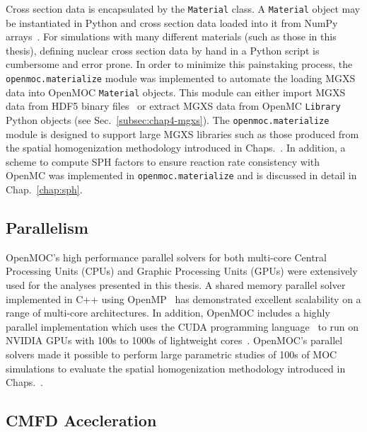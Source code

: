Cross section data is encapsulated by the \texttt{Material} class. A \texttt{Material} object may be instantiated in Python and cross section data loaded into it from NumPy arrays~\cite{walt2011numpy}. For simulations with many different materials (such as those in this thesis), defining nuclear cross section data by hand in a Python script is cumbersome and error prone. In order to minimize this painstaking process, the \texttt{openmoc.materialize} module was implemented to automate the loading \ac{MGXS} data into OpenMOC \texttt{Material} objects. This module can either import \ac{MGXS} data from HDF5 binary files~\cite{koranne2011hdf5} or extract \ac{MGXS} data from OpenMC \texttt{Library} Python objects (see Sec.~\ref{subsec:chap4-mgxs}). The \texttt{openmoc.materialize} module is designed to support large \ac{MGXS} libraries such as those produced from the spatial homogenization methodology introduced in Chaps.~. In addition, a scheme to compute \ac{SPH} factors to ensure reaction rate consistency with OpenMC was implemented in \texttt{openmoc.materialize} and is discussed in detail in Chap.~\ref{chap:sph}.

\subsection{Parallelism}
\label{subsubsec:chap4-openmoc-parallel}

OpenMOC's high performance parallel solvers for both multi-core Central Processing Units (CPUs) and Graphic Processing Units (GPUs) were extensively used for the analyses presented in this thesis. A shared memory parallel solver implemented in C++ using OpenMP~\cite{openmp2013} has demonstrated excellent scalability on a range of multi-core architectures\cite{boyd2016parallel}. In addition, OpenMOC includes a highly parallel implementation which uses the CUDA programming language~\cite{nvidia2012cuda} to run on NVIDIA GPUs with 100s to 1000s of lightweight cores~\cite{boyd2013massively}. OpenMOC's parallel solvers made it possible to perform large parametric studies of 100s of \ac{MOC} simulations to evaluate the spatial homogenization methodology introduced in Chaps.~.


\subsection{CMFD Acecleration}
\label{subsubsec:chap4-openmoc-cmfd}

